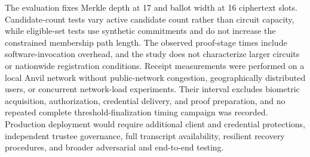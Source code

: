 The evaluation fixes Merkle depth at 17 and ballot width at 16 ciphertext slots. Candidate-count tests vary active candidate count rather than circuit capacity, while eligible-set tests use synthetic commitments and do not increase the constrained membership path length. The observed proof-stage times include software-invocation overhead, and the study does not characterize larger circuits or nationwide registration conditions. Receipt measurements were performed on a local Anvil network without public-network congestion, geographically distributed users, or concurrent network-load experiments. Their interval excludes biometric acquisition, authorization, credential delivery, and proof preparation, and no repeated complete threshold-finalization timing campaign was recorded. Production deployment would require additional client and credential protections, independent trustee governance, full transcript availability, resilient recovery procedures, and broader adversarial and end-to-end testing.
